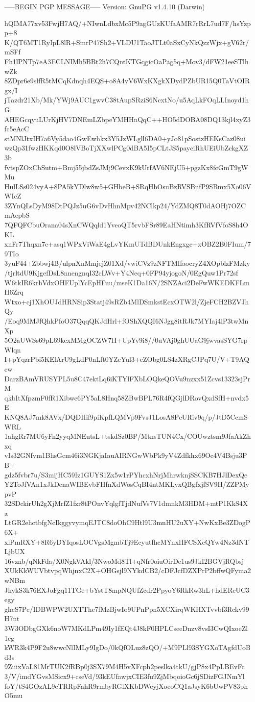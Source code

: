 -----BEGIN PGP MESSAGE-----
Version: GnuPG v1.4.10 (Darwin)

hQIMA77xv53FwjH7AQ/+NIwnLdbxMc5P9agGUzKUfaAMR7rRrL7ud7F/hsYzpp+8
K/QT6MT1RyIpL8lR+SmrP47Sh2+VLDU1TaoJTLt0aSxCyNkQzzWjx+gV62r/mSFf
Fh1lPNTp7eA3ECLNIMh5BBt2h7CQntKTGqgicOaPag5q+Mov3/dFW21eeSTlhwZk
8ZDpr6e9slfR5tMCqKdnqh4EQS+o8A4vV6WxKXgkXDydPZbUR15Q0TaVtOIRgx/I
jTazdr21Xb/Mk/YWj9AUC1gwvC38tAupSRziS6NcxtNo/u5AqLkFOqLLInoyd1hG
AHEGcqyuLUrKjHV7DNEmLZbpeYMHHnQqC++HO5dDOBA08DQ13kjl4xyZ3fc5eAcC
stMNlJtxIH7a6Vy5dao4GwEwhkx3Y5JzWLgll6DA0+yJo81pSostzHEKsCaz08ui
wzQp31fwzHKKqd0O8lVBoTjXXwlPCg0dBA5I5pCLtJS5payciRhUEiUbZckgXZ3b
fvtspZOxCbSutm+Bmj55jbdZsJMj9CevxK9kUrfAV6NEjU5+pgzKx8fcGmT9gWMu
HulLSs024vyA+8PA5kYDlw8w5+GHbeB+SRqHhOsuBzRVSBnfP9SBmx5Xo06VWIcZ
3ZYnQLsDyM98DtPQJz5uG6vDvHhnMpv42NClkp24/YdZMQ8T0dAOHj7OZCmAepbS
7QFQFCbuOrana04sXnCWQqld1YveoQT5rvbFSr89EaHNtimh3KfRVfVfoS8h4OKL
xnFr7Thqxn7c+asq1WPxViWaE4gLvYKmUTdBDUnkEngxge+xOBZ2B0FIum/79TIo
3yuF44+Zbbwj4B/ulpnXnMmjejZ01Xd/vwiCVz9zNFTMIfaocryZ4XOpblzFMzky
/tjrltdU9KjgefDsL8nnengnqI32cLWv+Y4Neq+0FP94yjogoN/0EgQuw1Pr72sf
W6tkIR6krbVdxOHFUplYcEpHFuu/mseK1Da16N/2SNZAci2DeFwWKEDKFLmH6Zrq
Wtxo+cj1XhOUJdHRNSip3Statj49sRZb4MlDSmkstEcxOTW2l/ZjeFCH2BZVJhQy
/Eoq9MMJfQhkPfoO37QqqQKJdHrl+fOShXQQI6NJgg8itRJk7MYIaj4iP3twMnXp
5O2aUWSs69pL69kcxMMgOCZW7H+UpYv9i8//0uVAj0ghUUaG9jwvasSYG7rpWlqn
I+pYqzrPbi5KElArU9gLdP0nLft0YZcYul3+cZObg0LS4zXRgCJPq7U/V+T9AQcw
DarzBAmVRUSYPL5u8C47ektLq6iKTYlFXbLOQkeQOVu9nzxx51Zcvs13323sjPrM
qkbItXfpzmF0fR1Xibwc6PY5aL8Hnq58ZBwBPL76R4fQGjlDRovQxdSfH+nvdx5E
KNQ8AJ7mk8AVx/DQDHif9piKpfLQMVp9FvsJ1LosA8PcURiv9q/p/JtD5CcmSWRL
1ahgRr7MU6yFn2yyqMNEutsL+tskdSz0BP/MtnsTUN4Cx/COUwztsm9JfaAkZhxq
vIs32GNfvm1BhsGcm46i3NGKjaIauAIRNGwWbPk9yV4Zdfkhx69Oc4V4Bsju3PB+
gdz5fvbr7u/S3mijHC59Iz1GUYS1Zx5w1rPYhcxhNrjMhrwknjSSCKB7HJlDexQe
Y2ToJfVAn1xJkDcnaWIBEvbFHfnXdWosCqBI4ntMKLyxQBgfxjfSV9H/ZZPMypvP
32SDckirUh2gXjMrfZ1fzr8tPOnvYqlgfTjdNufVs7V1dmnkM3HDM+mtP1KkS4Xa
LtGR2ehctbfgNcIkggyvymqEJTC8doOhC9Htl9U3mnHU2uXY+NwKxBe3ZDogP6X+
xlPmRXY+8R6yDYIqosLOCVgsMgmbTj9EeyutfhcMYnxHFCSXeQYw4Nz3dNTLjbUX
16vznb/qNkFda/X0NgkVAkl/3NwoMd8Tl+qNfr0oiuOirDe1us9JkI2BGVjRQbsj
XUkKkWUVbtvpqWhjnxC2X+OHGsjl9NYkdCB2/cDFJcfDZXPrP2bffwQFyma2wNBm
JhykS3k76EXJoFgq11TGe+bYstT8mpNQUfZcdr2PpyoY6RkRw3hL+hdERcUC3egy
ghcS7Pc/IDBWPW2UXTThc7fMzBjwIo9UPnPpn5XCXirqWKHXTvvbf3Rckv99H7nt
3W3ODbgGXk6noW7MKdLPm49Iy1fEQt4J8kF0HPLCseeDnzv8vsI3CwQIxoeZl1eg
kWR3k4P9F2u8wwcNlIMLy9IgDo/0kQfOLuz8zQO/+M9PLl93SYGXoTAgfdUoBd3s
9ZiiixVaL81MrTUK2fRBp0j3SX79M4H5vXFcph2peslka4tkU/gjP8x4PpLBEvFc
3/V/imdYGvsMSicx9+cseVd/93kEUfawjxCIE3fu9ZjMbqoioGc6jSDizFGJNmYl
foY/tS4GOzAL9cTRRpFahR9rmbyRGlXKbDWeyjXoeoCQ1aJsyK6bUwPV83phO5mu
